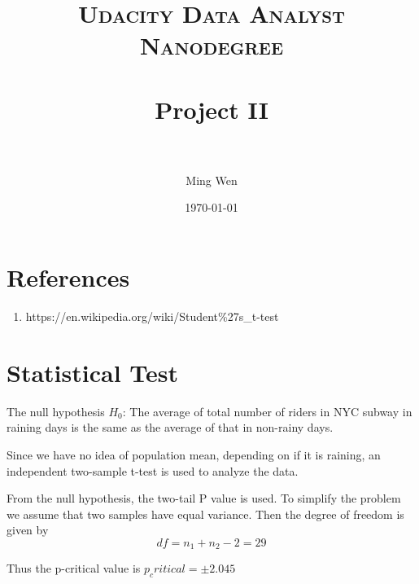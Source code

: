 \documentclass[paper=a4, fontsize=11pt]{scrartcl} %
\title{	
\normalfont \normalsize 
\textsc{Udacity Data Analyst Nanodegree} \\ [25pt] %
\horrule{0.5pt} \\[0.4cm] %
\LARGE{Project II} \\ %
\horrule{0.5pt} \\[0.5cm] %
}
\author{Ming Wen} %
\date{\normalsize\today} %
\numberwithin{equation}{section} %
\numberwithin{figure}{section} %
\numberwithin{table}{section} %
\begin{document}
\maketitle %


\section{References}

\medskip
\noindent{}
\medskip

\begin{enumerate}
	\item https://en.wikipedia.org/wiki/Student\%27s\_t-test
\end{enumerate}


\section{Statistical Test}

\medskip
\noindent{}
\medskip

The null hypothesis $H_0$: The average of total number of riders in NYC subway
in raining days is the same as the average of that in non-rainy days.

Since we have no idea of population mean, depending on if it is raining,
an independent two-sample t-test is used to analyze the data.

From the null hypothesis, the two-tail P value is used. To simplify the problem
we assume that two samples have equal variance. Then the degree of freedom is given by
\begin{equation}
	df = n_1 + n_2 - 2 = 29
\end{equation}

Thus the p-critical value is $p_critical = \pm 2.045$
\end{document}
